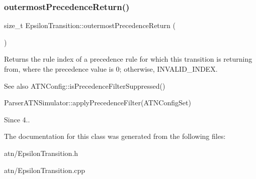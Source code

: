 \subsubsection{\texorpdfstring{outermost\+Precedence\+Return()}{outermostPrecedenceReturn()}}
{\footnotesize\ttfamily size\+\_\+t Epsilon\+Transition\+::outermost\+Precedence\+Return (\begin{DoxyParamCaption}{ }\end{DoxyParamCaption})}

\begin{DoxyReturn}{Returns}
the rule index of a precedence rule for which this transition is returning from, where the precedence value is 0; otherwise, I\+N\+V\+A\+L\+I\+D\+\_\+\+I\+N\+D\+EX.
\end{DoxyReturn}
\begin{DoxySeeAlso}{See also}
A\+T\+N\+Config\+::is\+Precedence\+Filter\+Suppressed() 

Parser\+A\+T\+N\+Simulator\+::apply\+Precedence\+Filter(\+A\+T\+N\+Config\+Set) 
\end{DoxySeeAlso}
\begin{DoxySince}{Since}
4.. 
\end{DoxySince}


The documentation for this class was generated from the following files\+:\begin{DoxyCompactItemize}
\item 
atn/Epsilon\+Transition.\+h\item 
atn/Epsilon\+Transition.\+cpp\end{DoxyCompactItemize}
